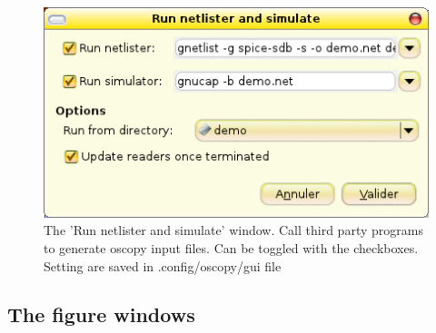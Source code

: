\documentclass[a4paper,11pt]{article}
\begin{document}
\begin{figure}[htbp]
  \includegraphics[scale=.5]{../png/ioscopy-netnsim.png}
  \caption{The 'Run netlister and simulate' window. Call third party programs to generate oscopy input files. Can be toggled with the checkboxes. Setting are saved in .config/oscopy/gui file}
  \label{fig:netnsim}

\end{figure}



\subsection{The figure windows}

\end{document}
